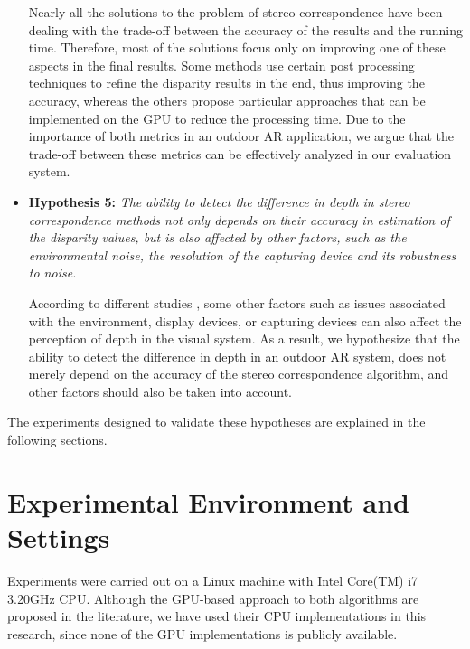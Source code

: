 \begin{itemize}
Nearly all the solutions to the problem of stereo correspondence have been dealing with the trade-off between the accuracy of the results and the running time.
Therefore, most of the solutions focus only on improving one of these aspects in the final results. Some methods use certain post processing techniques to refine the 
disparity results in the end, thus improving the accuracy, whereas the others propose particular approaches that can be implemented on the GPU to reduce the processing time.
Due to the importance of both metrics in an outdoor AR application, we argue that the trade-off between these metrics can be effectively analyzed in our evaluation system.

\item \textbf{Hypothesis 5:} \emph{The ability to detect the difference in depth in stereo correspondence methods not only depends on their accuracy
in estimation of the disparity values, but is also affected by other factors, such as the environmental noise, the resolution of the capturing device and its
robustness to noise.}

According to different studies \cite{dras96, kru10,azuma01}, some other factors such as issues associated with the environment, display devices, or capturing devices
can also affect the perception of depth in the visual system. As a result, we hypothesize that the ability to detect the difference in depth in an outdoor AR system,
does not merely depend on the accuracy of the stereo correspondence algorithm, and other factors should also be taken into account.
\end{itemize}
\noindent
The experiments designed to validate these hypotheses are explained in the following sections.

\section{Experimental Environment and Settings}
Experiments were carried out on a Linux machine with Intel Core(TM) i7 3.20GHz CPU. 
Although the GPU-based approach to both algorithms are proposed in the literature,
we have used their CPU implementations in this research, since none of the GPU implementations is publicly available.

